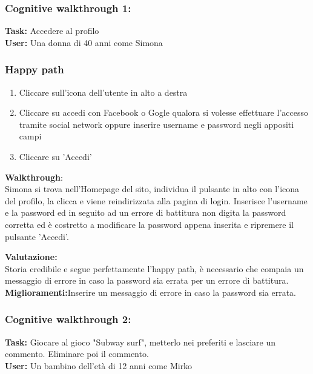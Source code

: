 \documentclass[../Report.tex]{subfiles}
\begin{document}
    \subsubsection{Cognitive walkthrough 1:}
    \textbf{Task:} Accedere al profilo\\
    \textbf{User:} Una donna di 40 anni come Simona
    \subsubsection{Happy path}
    \begin{enumerate}
        \item Cliccare sull'icona dell'utente in alto a destra
        \item Cliccare su accedi con Facebook o Gogle qualora si volesse effettuare l'accesso tramite social network oppure inserire username e password negli appositi campi
        \item Cliccare su 'Accedi'
    \end{enumerate}
    \textbf{Walkthrough}:\\
    Simona si trova nell'Homepage del sito, individua il pulsante in alto con l'icona del profilo, la clicca e viene reindirizzata alla pagina di login.
    Inserisce l'username e la password ed in seguito ad un errore di battitura non digita la password corretta ed è costretto a modificare la password appena inserita e ripremere il pulsante 'Accedi'.

    \textbf{Valutazione:}\\Storia credibile e segue perfettamente l'happy path, è necessario che compaia un messaggio di errore in caso la password sia errata per un errore di battitura.\\

    \textbf{Miglioramenti:}Inserire un messaggio di errore in caso la password sia errata.\\

    \subsubsection{Cognitive walkthrough 2:}
    \textbf{Task:} Giocare al gioco "Subway surf", metterlo nei preferiti e lasciare un commento. Eliminare poi il commento.\\
    \textbf{User:} Un bambino dell'età di 12 anni come Mirko
\end{document}
